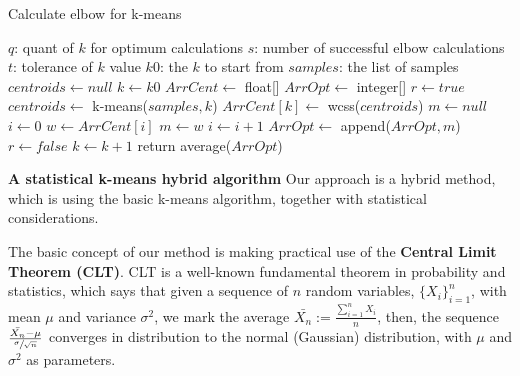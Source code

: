 \documentclass[12pt]{article}
\begin{document}
\begin{algorithm}
\caption{Calculate elbow for k-means}
\begin{algorithmic} 
\REQUIRE
\STATE $q$: quant of $k$ for optimum calculations
\STATE $s$: number of successful elbow calculations
\STATE $t$: tolerance of $k$ value
\STATE $k0$: the $k$ to start from
\STATE $samples$: the list of samples
\ENSURE 
\STATE $centroids \leftarrow null$
\newline
\STATE $k \leftarrow k0$
\newline
\STATE $ArrCent \leftarrow $ float[]
\STATE $ArrOpt \leftarrow $ integer[]
\newline
\STATE $r \leftarrow true$
\newline
{}
\STATE $centroids \leftarrow $ k-means($samples, k$)
\newline
\STATE $ArrCent[k] \leftarrow $ wcss($centroids$)
\newline
{}
\STATE $m \leftarrow null$
\newline
\STATE $i \leftarrow 0$
\STATE $w \leftarrow ArrCent[i]$
\newline
{}
\STATE $m \leftarrow w$
\ENDIF
\newline
\STATE $i \leftarrow i+1$
\ENDWHILE
\STATE $ArrOpt \leftarrow $ append($ArrOpt,m$)
\ENDIF
{}
\STATE $r \leftarrow false$
\ELSE
\STATE $k \leftarrow k+1$
\ENDIF
\newline
\ENDWHILE
\STATE return average($ArrOpt$)
\end{algorithmic}
\end{algorithm}

\newpage
\textbf{A statistical k-means hybrid algorithm} \newline
Our approach is a hybrid method, which is using the basic k-means algorithm, together with statistical considerations. \newline

The basic concept of our method is making practical use of the \textbf{Central Limit Theorem (CLT)}. \newline
CLT is a well-known fundamental theorem in probability and statistics, which says that given a sequence of $n$ random variables, \( \{X_i\}_{i=1}^n \), with mean $\mu$ and variance $\sigma^2$, we mark the average 
\( \bar{X_n}:=\frac{\sum_{i=1}^n X_i}{n} \), then,\newline
the sequence \( \frac{\bar{X_n}-\mu}{\sfrac{\sigma}{\sqrt{n}}} \) converges in distribution 
to the normal (Gaussian) distribution, with $\mu$ and $\sigma^2$ as parameters.
\end{document}

